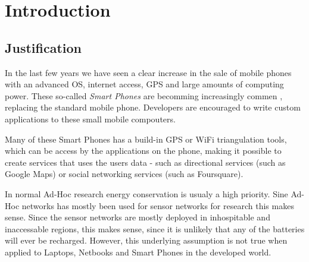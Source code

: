 \section{Introduction}


\subsection{Justification}
In the last few years we have seen a clear increase in the sale of mobile phones with an advanced OS, internet access, GPS and large amounts of computing power. These so-called \emph{Smart Phones} are becomming increasingly commen , replacing the standard mobile phone. Developers are encouraged to write custom applications to these small mobile compouters.

Many of these Smart Phones has a build-in GPS or WiFi triangulation tools, which can be access by the applications on the phone, making it possible to create services that uses the users data - such as directional services (such as Google Maps) or social networking services (such as Foursquare).

In normal Ad-Hoc research energy conservation is usualy a high priority. Sine Ad-Hoc networks has mostly been used for sensor networks for research this makes sense. Since the sensor networks are mostly deployed in inhospitable and inaccessable regions, this makes sense, since it is unlikely that any of the batteries will ever be recharged. However, this underlying assumption is not true when applied to Laptops, Netbooks and Smart Phones in the developed world.  

